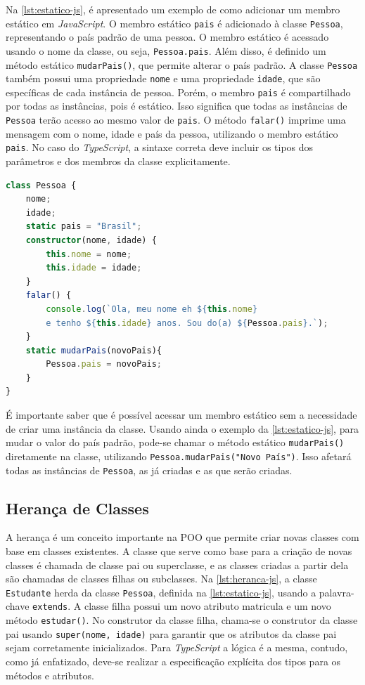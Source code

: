 Na \autoref{lst:estatico-js}, é apresentado um exemplo de como adicionar um membro estático em \textit{JavaScript}. O membro estático \texttt{pais} é adicionado à classe \texttt{Pessoa}, representando o país padrão de uma pessoa. O membro estático é acessado usando o nome da classe, ou seja, \texttt{Pessoa.pais}. Além disso, é definido um método estático \texttt{mudarPais()}, que permite alterar o país padrão. A classe \texttt{Pessoa} também possui uma propriedade \texttt{nome} e uma propriedade \texttt{idade}, que são específicas de cada instância de pessoa. Porém, o membro \texttt{pais} é compartilhado por todas as instâncias, pois é estático. Isso significa que todas as instâncias de \texttt{Pessoa} terão acesso ao mesmo valor de \texttt{pais}. O método \texttt{falar()} imprime uma mensagem com o nome, idade e país da pessoa, utilizando o membro estático \texttt{pais}. No caso do \textit{TypeScript}, a sintaxe correta deve incluir os tipos dos parâmetros e dos membros da classe explicitamente. 

\begin{lstlisting}[language=TypeScript, caption=Adicionando membro estático em \textit{JavaScript}., label=lst:estatico-js]
class Pessoa {
    nome;
    idade;
    static pais = "Brasil";
    constructor(nome, idade) {
        this.nome = nome;
        this.idade = idade;
    }
    falar() {
        console.log(`Ola, meu nome eh ${this.nome} 
        e tenho ${this.idade} anos. Sou do(a) ${Pessoa.pais}.`);
    }
    static mudarPais(novoPais){
        Pessoa.pais = novoPais;
    }
}
\end{lstlisting}


É importante saber que é possível acessar um membro estático sem a necessidade de criar uma instância da classe. Usando ainda o exemplo da \autoref{lst:estatico-js}, para mudar o valor do país padrão, pode-se chamar o método estático \texttt{mudarPais()} diretamente na classe, utilizando \texttt{Pessoa.mudarPais("Novo País")}. Isso afetará todas as instâncias de \texttt{Pessoa}, as já criadas e as que serão criadas.



\subsection{Herança de Classes}

A herança é um conceito importante na POO que permite criar novas classes com base em classes existentes. A classe que serve como base para a criação de novas classes é chamada de classe pai ou superclasse, e as classes criadas a partir dela são chamadas de classes filhas ou subclasses. Na \autoref{lst:heranca-js}, a classe \texttt{Estudante} herda da classe \texttt{Pessoa}, definida na \autoref{lst:estatico-js}, usando a palavra-chave \texttt{extends}. A classe filha possui um novo atributo matricula e um novo método \texttt{estudar()}. No construtor da classe filha, chama-se o construtor da classe pai usando \texttt{super(nome, idade)} para garantir que os atributos da classe pai sejam corretamente inicializados. Para \textit{TypeScript} a lógica é a mesma, contudo, como já enfatizado, deve-se realizar a especificação explícita dos tipos para os métodos e atributos.


